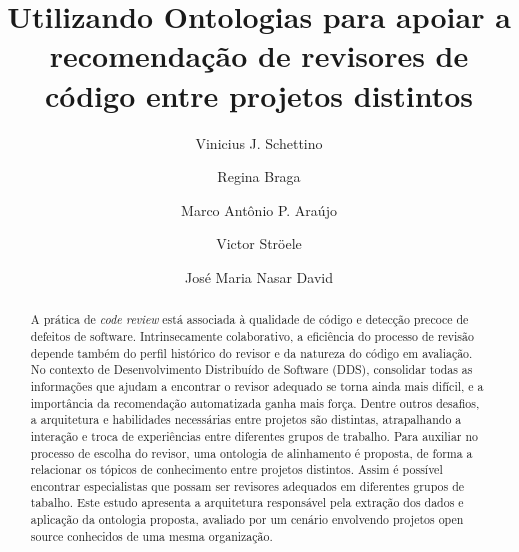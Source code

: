 \documentclass[sigconf]{acmart}
\begin{document}
\title{Utilizando Ontologias para apoiar a recomendação de revisores de código entre projetos distintos}

\author{Vinicius J. Schettino}

\author{Regina Braga}

\author{Marco Antônio P. Araújo}

\author{Victor Ströele}

\author{José Maria Nasar David}

\renewcommand{\shortauthors}{Schettino et al.}


\begin{abstract}
A prática de \textit{code review} está associada à qualidade de código e detecção precoce de defeitos de software. Intrinsecamente colaborativo, a eficiência do processo de revisão depende também do perfil histórico do revisor e da natureza do código em avaliação. No contexto de Desenvolvimento Distribuído de Software (DDS), consolidar todas as informações que ajudam a encontrar o revisor adequado se torna ainda mais difícil, e a importância da recomendação automatizada ganha mais força. Dentre outros desafios, a arquitetura e habilidades necessárias entre projetos são distintas, atrapalhando a interação e troca de experiências entre diferentes grupos de trabalho. Para auxiliar no processo de escolha do revisor, uma ontologia de alinhamento é proposta, de forma a relacionar os tópicos de conhecimento entre projetos distintos. Assim é possível encontrar especialistas que possam ser revisores adequados em diferentes grupos de tabalho. Este estudo apresenta a  arquitetura responsável pela extração dos dados e aplicação da ontologia proposta, avaliado por um cenário envolvendo projetos open source conhecidos de uma mesma organização.
\end{abstract}
\end{document}
